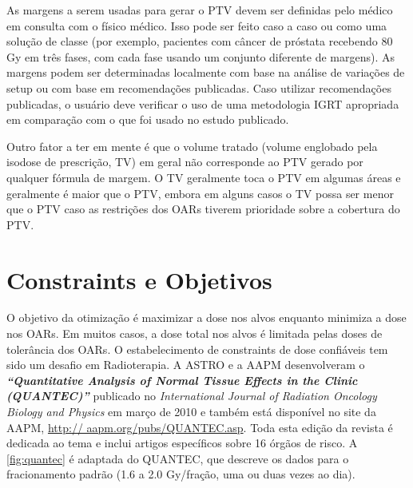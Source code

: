 \documentclass[11pt,a4paper]{article}
\newcounter{exemplo}
\begin{document}
	As margens a serem usadas para gerar o PTV devem ser definidas pelo médico em consulta com o físico médico. Isso pode ser feito caso a caso ou como uma solução de classe (por exemplo, pacientes com câncer de próstata recebendo 80 Gy em três fases, com cada fase usando um conjunto diferente de margens). As margens podem ser determinadas localmente com base na análise de variações de setup ou com base em recomendações publicadas. Caso utilizar recomendações publicadas, o usuário deve verificar o uso de uma metodologia IGRT apropriada em comparação com o que foi usado no estudo publicado.

	Outro fator a ter em mente é que o volume tratado (volume englobado pela isodose de prescrição, TV) em geral não corresponde ao PTV gerado por qualquer fórmula de margem. O TV geralmente toca o PTV em algumas áreas e geralmente é maior que o PTV, embora em alguns casos o TV possa ser menor que o PTV caso as restrições dos OARs tiverem prioridade sobre a cobertura do PTV.

\section{Constraints e Objetivos}

	O objetivo da otimização é maximizar a dose nos alvos enquanto minimiza a dose nos OARs. Em muitos casos, a dose total nos alvos é limitada pelas doses de tolerância dos OARs. O estabelecimento de constraints de dose confiáveis tem sido um desafio em Radioterapia. A ASTRO  e a AAPM desenvolveram o \textbf{\textit{``Quantitative Analysis of Normal Tissue Effects in the Clinic (QUANTEC)''}} publicado no \textit{International Journal of Radiation Oncology Biology and Physics} em março de 2010 e também está disponível no site da AAPM, \href{http:// aapm.org/pubs/QUANTEC.asp}{http:// aapm.org/pubs/QUANTEC.asp}. Toda esta edição da revista é dedicada ao tema e inclui artigos específicos sobre 16 órgãos de risco. A \ref{fig:quantec} é adaptada do QUANTEC, que descreve os dados para o fracionamento padrão (1.6 a 2.0 Gy/fração, uma ou duas vezes ao dia).
\end{document}
